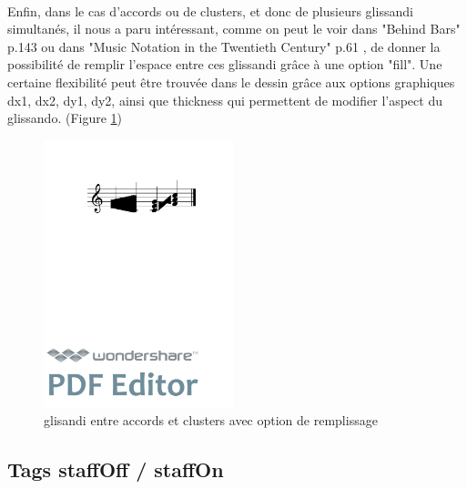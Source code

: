 \documentclass[a4paper,10pt,twocolumn]{article}
\newenvironment{code}
  {\fontfamily{pnc}\selectfont}{}
\begin{document}
\paragraph{}
Enfin, dans le cas d'accords ou de clusters, et donc de plusieurs glissandi simultanés, il nous a paru intéressant, comme on peut le voir dans "Behind Bars" p.143 \cite{ref3} ou dans "Music Notation in the Twentieth Century" p.61 \cite{ref2}, de donner la possibilité de remplir l'espace entre ces glissandi grâce à une option "fill". Une certaine flexibilité peut être trouvée dans le dessin grâce aux options graphiques dx1, dx2, dy1, dy2, ainsi que thickness qui permettent de modifier l'aspect du glissando. (Figure \ref{fig:glissandofill})

\begin{figure}[h]
\begin{center}
\begin{code}
[ \textbackslash{}glissando\textless{}fill="true", dx1=-2, dx2=2, thickness=2.2\textgreater{}(\textbackslash{}cluster(\{e,g\} \{c,b\}))
\textbackslash{}glissando\textless{}fill="true"\textgreater{}(\{c,e,g\} \{a,c2,f1\}) ]
\end{code}

\includegraphics[width=55mm]{img/glissandofill.pdf}
\caption{glisandi entre accords et clusters avec option de remplissage}
\label{fig:glissandofill}
\end{center}
\end{figure}

\newpage

\subsection{Tags staffOff / staffOn}
\end{document}
